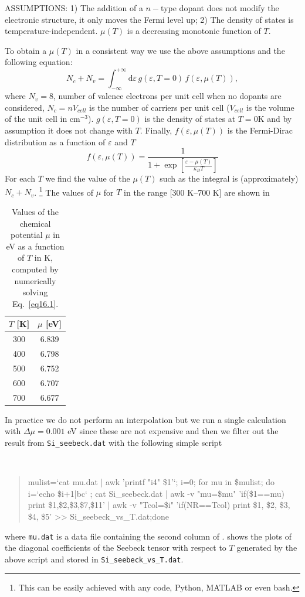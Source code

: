 \begin{itemize}
ASSUMPTIONS: 1) The addition of a $n-$type dopant does not modify the electronic structure, it only moves the Fermi level up; 2) The density of states is temperature-independent. $\mu(T)$ is a decreasing monotonic function of $T$.

To obtain a $\mu(T)$ in a consistent way we use the above assumptions and the following equation:
\begin{equation}
N_c + N_v = \int_{-\infty}^{+\infty}\! \mathrm{d}\varepsilon \, g(\varepsilon,T=0)\,f(\varepsilon,\mu(T)),\label{eq16.1}
\end{equation}
where $N_v=8$, number of valence electrons per unit cell when no dopants are considered, $N_c= nV_{cell}$ is the number of carriers per unit cell ($V_{cell}$ is the volume of the unit cell in cm$^{-3}$). $g(\varepsilon,T=0)$ is the density of states at $T=0$K and by assumption it does not change with $T$. Finally, $f(\varepsilon,\mu(T))$ is the Fermi-Dirac distribution as a function of $\varepsilon$ and $T$
\begin{equation}
f(\varepsilon,\mu(T)) = \frac{1}{1 + \exp[\frac{\varepsilon - \mu(T)}{\kappa_B T}]}
\end{equation}
For each $T$ we find the value of the $\mu(T)$ such as the integral is (approximately) $N_c + N_v$. %
\footnote{\footnotesize{This can be easily achieved with any code, \eg{} Python, MATLAB or even bash.}}
The values of $\mu$ for $T$ in the range [300 K--700 K] are shown in 
\begin{table}
\centering
\captionsetup{width=.5\textwidth}
\caption{Values of the chemical potential $\mu$ in eV as a function of $T$ in K, computed by numerically solving Eq.~\ref{eq16.1}.}
\begin{tabular}{@{} cc @{}}\toprule[1.5pt]
$T$ [K] & $\mu$ [eV] \\\midrule
300 & 6.839 \\
400 & 6.798 \\
500 & 6.752 \\
600 & 6.707 \\
700 & 6.677 \\\bottomrule[1pt]
\end{tabular}\label{tab16.1}
\end{table} 

In practice we do not perform an interpolation but we run a single calculation with $\Delta \mu = 0.001$ eV since these are not expensive and then we filter out the result from {\tt Si\_seebeck.dat} with the following simple script
{\tt
\begin{quote}
mulist=`cat mu.dat | awk '{printf "i4" \$1}'`; i=0; for mu in \$mulist; do i=`echo \$i+1|bc` ; cat Si\_seebeck.dat | awk -v "mu=\$mu" '{if(\$1==mu) print \$1,\$2,\$3,\$7,\$11}' | awk -v "Tcol=\$i" '{if(NR==Tcol) print \$1, \$2, \$3, \$4, \$5}' >> Si\_seebeck\_vs\_T.dat;done
\end{quote}
}
where {\tt mu.dat} is a data file containing the second column of .  shows the plots of the diagonal coefficients of the Seebeck tensor with respect to $T$ generated by the above script and stored in {\tt Si\_seebeck\_vs\_T.dat}.


\end{itemize}
